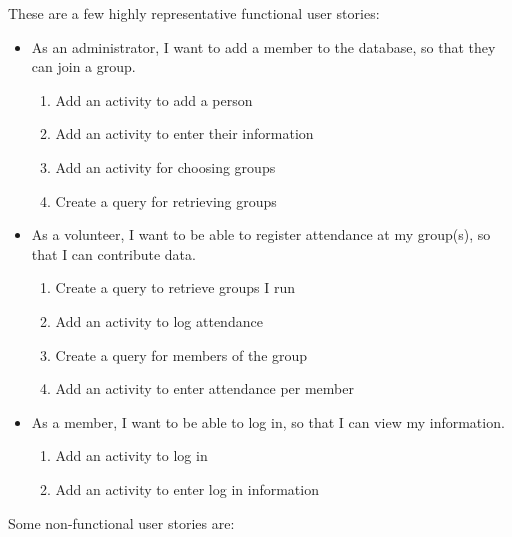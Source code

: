 \documentclass{l3proj}
\begin{document}
These are a few highly representative functional user stories:
\begin{itemize}
\item As an administrator, I want to add a member to the database, so that they can join a group.

	\begin{enumerate}
	\item Add an activity to add a person
	\item Add an activity to enter their information
	\item Add an activity for choosing groups
	\item Create a query for retrieving groups
	\end{enumerate}

\item As a volunteer, I want to be able to register attendance at my group(s), so that I can contribute data.

	\begin{enumerate}
	\item Create a query to retrieve groups I run
	\item Add an activity to log attendance
	\item Create a query for members of the group
	\item Add an activity to enter attendance per member
	\end{enumerate}

\item As a member, I want to be able to log in, so that I can view my information.

	\begin{enumerate}
	\item Add an activity to log in
	\item Add an activity to enter log in information
	\end{enumerate}
\end{itemize}

Some non-functional user stories are:
\end{document}
